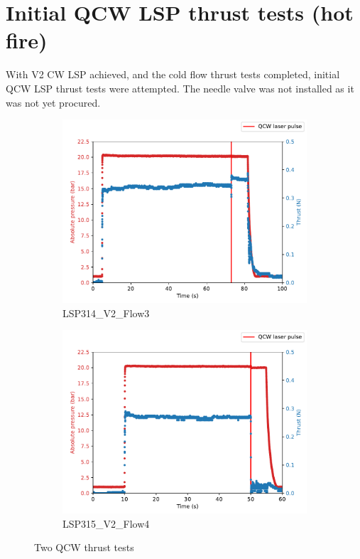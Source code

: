         

    \section{Initial QCW LSP thrust tests (hot fire)}
 
        With V2 CW LSP achieved, and the cold flow thrust tests completed, initial QCW LSP thrust tests were attempted. The needle valve was not installed as it was not yet procured. 

        \begin{figure}[!ht]
            \centering
            \begin{subfigure}[t]{0.45\textwidth}
                \centering
                \includegraphics[width=\textwidth]{assets/4 experiments/LSP314.pdf}
                \caption{LSP314\_V2\_Flow3}
            \end{subfigure}
            \hfill
            \begin{subfigure}[t]{0.45\textwidth}
                \centering
                \includegraphics[width=\textwidth]{assets/4 experiments/LSP315.pdf}
                \caption{LSP315\_V2\_Flow4}
            \end{subfigure}
            \caption{Two QCW thrust tests}
            \label{fig:QCW LSP thrust tests}
        \end{figure}


